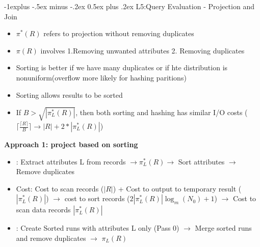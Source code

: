 \documentclass[10pt, landscape]{article}
\makeatletter
\renewcommand{\subsection}{\@startsection{subsection}{2}{0mm}%
                                {-1explus -.5ex minus -.2ex}%
                                {0.5ex plus .2ex}%
                                {\normalfont\normalsize\bfseries}}
\newcommand{\ceil}[1]{\lceil #1 \rceil}
\makeatother
\begin{document}
\begin{multicols}{4}
\subsection{L5:Query Evaluation - Projection and Join}
\begin{itemize}
  \item $\pi^*(R)$ refers to projection without removing duplicates
  \item $\pi(R)$ involves 1.Removing unwanted attributes 2. Removing duplicates
  \item Sorting is better if we have many duplicates or if hte distribution is nonuniform(overflow more likely for hashing paritions)
  \item Sorting allows results to be sorted
  \item If $B > \sqrt{|\pi^*_L(R)|}$, then both sorting and hashing has similar I/O costs ($\ceil{\frac{\ceil{R}}{B}} \rightarrow |R| + 2*|\pi^*_L(R)|$)
\end{itemize}

\textbf{Approach 1: project based on sorting}
\begin{itemize}
  \item \textbf{\color{red}{Naive}}: Extract attributes L from records $\rightarrow\pi^*_L(R) \rightarrow$ Sort attributes $\rightarrow$ Remove duplicates
  \item Cost: Cost to scan records ($|R|$) + Cost to output to temporary result ($|\pi^*_L(R)|$) $\rightarrow$ cost to sort records ($2|\pi^*_L(R)|\log_m(N_0)+1$) $\rightarrow$ Cost to scan data records $|\pi^*_L(R)|$
  \item \textbf{\color{green}{Optimisation}}: Create Sorted runs with attributes L only (Pass 0) $\rightarrow$ Merge sorted runs and remove duplicates $\rightarrow$ $\pi_L(R)$ 
\end{itemize}


\end{multicols}
\end{document}
